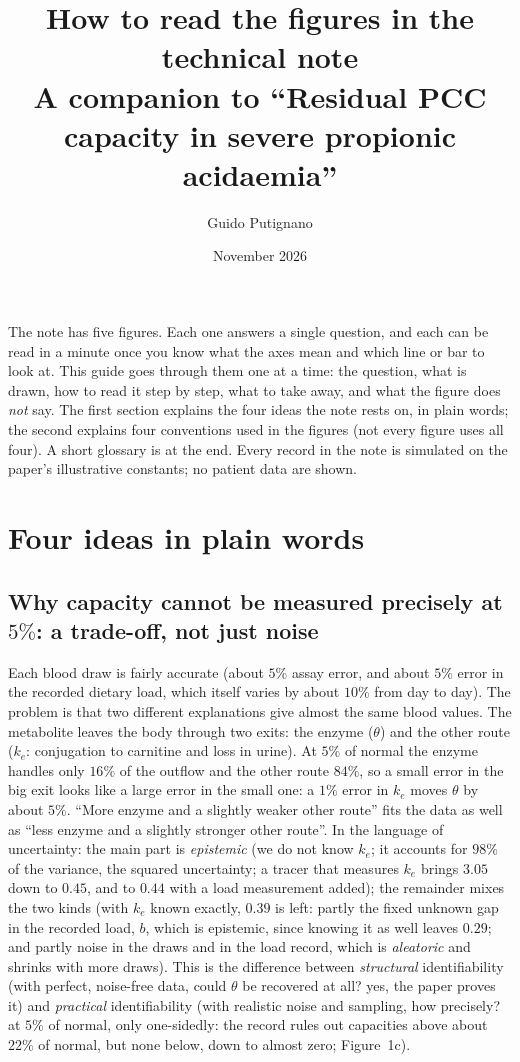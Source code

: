 \documentclass[11pt,a4paper]{article}
\title{\textbf{How to read the figures in the technical note}\\[2pt]
\large A companion to ``Residual PCC capacity in severe propionic acidaemia''}
\author{Guido Putignano}
\date{November 2026}
\begin{document}
\maketitle

\noindent The note has five figures. Each one answers a single question, and each can be read
in a minute once you know what the axes mean and which line or bar to look at. This guide goes
through them one at a time: the question, what is drawn, how to read it step by step, what to
take away, and what the figure does \emph{not} say. The first section explains the four ideas
the note rests on, in plain words; the second explains four conventions used in the figures (not
every figure uses all four). A short glossary is at the end. Every
record in the note is simulated on the paper's illustrative constants; no patient data are
shown.

\section{Four ideas in plain words}

\subsection{\texorpdfstring{Why capacity cannot be measured precisely at $5\%$: a trade-off, not just noise}{Why capacity cannot be measured precisely at 5 percent: a trade-off, not just noise}}
Each blood draw is fairly accurate (about $5\%$ assay error, and about $5\%$ error in the
recorded dietary load, which itself varies by about $10\%$ from day to day). The
problem is that two different explanations give almost the same blood values. The metabolite
leaves the body through two exits: the enzyme ($\theta$) and the other route ($k_e$: conjugation
to carnitine and loss in urine). At $5\%$ of normal the enzyme handles only $16\%$ of the outflow
and the other route $84\%$, so a small error in the big exit looks like a large error in the small
one: a $1\%$ error in $k_e$ moves $\theta$ by about $5\%$. ``More enzyme and a slightly weaker other
route'' fits the data as well as ``less enzyme and a slightly stronger other route''. In the
language of uncertainty: the main part is \emph{epistemic} (we do not know $k_e$; it accounts for
$98\%$ of the variance, the squared uncertainty; a tracer that measures $k_e$ brings $3.05$ down to
$0.45$, and to $0.44$ with a load measurement added); the remainder mixes the two kinds (with
$k_e$ known exactly, $0.39$ is left: partly the fixed unknown gap in the recorded load, $b$, which
is epistemic, since knowing it as well leaves $0.29$; and partly noise in the draws and in the
load record, which is \emph{aleatoric} and shrinks with more draws). This is the difference between \emph{structural} identifiability (with
perfect, noise-free data, could $\theta$ be recovered at all? yes, the paper proves it) and
\emph{practical} identifiability (with realistic noise and sampling, how precisely? at $5\%$ of
normal, only one-sidedly: the record rules out capacities above about $22\%$ of normal, but none
below, down to almost zero; Figure~1c).
\end{document}
